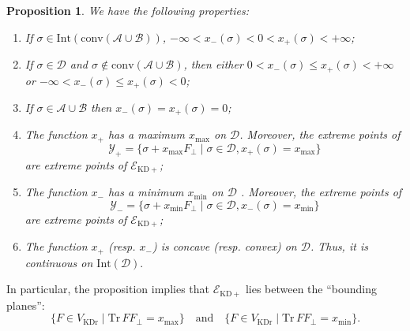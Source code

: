 \documentclass[a4paper, notitlepage, 11pt]{article}
\numberwithin{equation}{section}
\newcommand{\mcl}[1]{\mathcal{#1}}
\newcommand{\Acal}{{\mathcal A}}
\newcommand{\Bcal}{{\mathcal B}}
\newcommand{\EcalKDC}{{\mathcal E}_{\mathrm{KD+}}}
\newcommand{\R}{\mathbb{R}}
\newcommand{\Tr}{\mathrm{Tr}\,}
\newcommand{\conv}[1]{\mathrm{conv}\left(#1\right)}
\newcommand{\VR}{V_{\mathrm{KDr}}}
\newcommand{\convAB}{\conv{\Acal \cup \Bcal}}
\newtheorem{Prop}[Theorem]{Proposition}
\begin{document}
\begin{Prop}\label{prop:EKD2}
We have the following properties:
\begin{enumerate}[label=(\roman*),wide, labelindent=0pt]
	\item If $\sigma\in \mathrm{Int}(\convAB)$, $-\infty < x_{-}(\sigma) < 0 < x_{+}(\sigma) < +\infty$;
	\item If $\sigma\in\mcl{D}$ and $\sigma \notin \convAB$, then either $0<x_-(\sigma)\leq x_+(\sigma) < +\infty $ or $-\infty < x_-(\sigma)\leq x_+(\sigma)<0$;
	\item If $\sigma\in \Acal \cup \Bcal$ then $x_-(\sigma)=x_+(\sigma)=0$;
	\item The function $x_{+}$ has a maximum $x_{\max}$ on $\mcl{D}$. Moreover, the extreme points of 
 \[
 \mcl{Y}_{+}=\{\sigma + x_{\max}F_{\perp} \mid \sigma\in \mcl{D}, x_+(\sigma)=x_{\max}\}
 \]are extreme points of $\EcalKDC$;
	\item The function $x_{-}$ has a minimum $x_{\min}$ on $\mcl{D}$ . Moreover, the extreme points of 
 \[
 \mcl{Y}_{-}=\{\sigma + x_{\min}F_{\perp} \mid \sigma\in \mcl{D}, x_-(\sigma)=x_{\min}\}
 \]
 are extreme points of $\EcalKDC$;
	\item The function $x_{+}$ (resp. $x_{-}$) is concave (resp. convex) on $\mcl{D}$. Thus, it is continuous on $\mathrm{Int}(\mcl{D}).$ %
\end{enumerate}
\end{Prop}
In particular, the proposition implies  that $\EcalKDC$ lies between the ``bounding planes'':
$$
\{F\in \VR\mid \Tr F F_\perp=x_{\max}\}\quad\textrm{and}\quad 
\{F\in \VR\mid \Tr F F_\perp=x_{\min}\}.
$$
\end{document}

